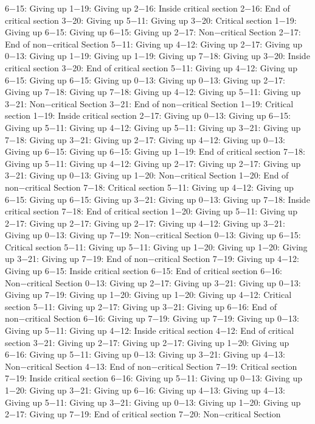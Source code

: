 6−15: Giving up
1−19: Giving up
2−16: Inside critical section
2−16: End of critical section
3−20: Giving up
5−11: Giving up
3−20: Critical section
1−19: Giving up
6−15: Giving up
6−15: Giving up
2−17: Non−critical Section
2−17: End of non−critical Section
5−11: Giving up
4−12: Giving up
2−17: Giving up
0−13: Giving up
1−19: Giving up
1−19: Giving up
7−18: Giving up
3−20: Inside critical section
3−20: End of critical section
5−11: Giving up
4−12: Giving up
6−15: Giving up
6−15: Giving up
0−13: Giving up
0−13: Giving up
2−17: Giving up
7−18: Giving up
7−18: Giving up
4−12: Giving up
5−11: Giving up
3−21: Non−critical Section
3−21: End of non−critical Section
1−19: Critical section
1−19: Inside critical section
2−17: Giving up
0−13: Giving up
6−15: Giving up
5−11: Giving up
4−12: Giving up
5−11: Giving up
3−21: Giving up
7−18: Giving up
3−21: Giving up
2−17: Giving up
4−12: Giving up
0−13: Giving up
6−15: Giving up
6−15: Giving up
1−19: End of critical section
7−18: Giving up
5−11: Giving up
4−12: Giving up
2−17: Giving up
2−17: Giving up
3−21: Giving up
0−13: Giving up
1−20: Non−critical Section
1−20: End of non−critical Section
7−18: Critical section
5−11: Giving up
4−12: Giving up
6−15: Giving up
6−15: Giving up
3−21: Giving up
0−13: Giving up
7−18: Inside critical section
7−18: End of critical section
1−20: Giving up
5−11: Giving up
2−17: Giving up
2−17: Giving up
2−17: Giving up
4−12: Giving up
3−21: Giving up
0−13: Giving up
7−19: Non−critical Section
0−13: Giving up
6−15: Critical section
5−11: Giving up
5−11: Giving up
1−20: Giving up
1−20: Giving up
3−21: Giving up
7−19: End of non−critical Section
7−19: Giving up
4−12: Giving up
6−15: Inside critical section
6−15: End of critical section
6−16: Non−critical Section
0−13: Giving up
2−17: Giving up
3−21: Giving up
0−13: Giving up
7−19: Giving up
1−20: Giving up
1−20: Giving up
4−12: Critical section
5−11: Giving up
2−17: Giving up
3−21: Giving up
6−16: End of non−critical Section
6−16: Giving up
7−19: Giving up
7−19: Giving up
0−13: Giving up
5−11: Giving up
4−12: Inside critical section
4−12: End of critical section
3−21: Giving up
2−17: Giving up
2−17: Giving up
1−20: Giving up
6−16: Giving up
5−11: Giving up
0−13: Giving up
3−21: Giving up
4−13: Non−critical Section
4−13: End of non−critical Section
7−19: Critical section
7−19: Inside critical section
6−16: Giving up
5−11: Giving up
0−13: Giving up
1−20: Giving up
3−21: Giving up
6−16: Giving up
4−13: Giving up
4−13: Giving up
5−11: Giving up
3−21: Giving up
0−13: Giving up
1−20: Giving up
2−17: Giving up
7−19: End of critical section
7−20: Non−critical Section
